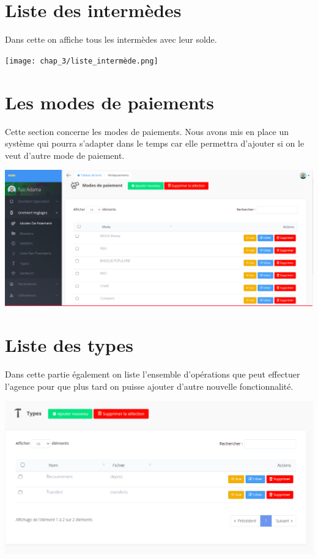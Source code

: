 	\section{Liste des intermèdes}
		Dans cette on affiche tous les intermèdes avec leur solde.\\
		\begin{center}
			\texttt{[image: chap\_3/liste\_intermède.png]}
			\label{liste_intermede}
		\end{center}
	\section{Les modes de paiements}
		Cette section concerne les modes de paiements. Nous avons mis en place un système qui pourra s'adapter dans le temps  car elle permettra d'ajouter si on le veut d'autre mode de paiement.\\
		\begin{center}
			\includegraphics[scale=0.4]{chap_3/mode_paiement.png}
			\label{mode_de_paiement}
		\end{center}
	\section{Liste des types}
		Dans cette partie également on liste l'ensemble d'opérations que peut effectuer l'agence pour que plus tard on puisse ajouter d'autre nouvelle fonctionnalité.
		\begin{center}
			\includegraphics[scale=0.4]{chap_3/types.png}
			\label{mode_de_paiment}
		\end{center}
